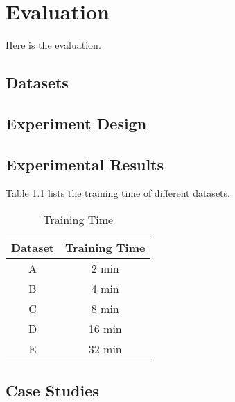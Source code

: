 \chapter{Evaluation} \label{chapter:evaluation}

Here is the evaluation.

\section{Datasets}

\section{Experiment Design}

\section{Experimental Results}

Table \ref{table:training_time} lists the training time of different datasets.

\begin{table}[h!]
\centering
\caption{Training Time}
\begin{tabular}{ |c|c| } 
\hline
\textbf{Dataset} & \textbf{Training Time} \\
\hline
\hline
A & 2 min \\
\hline
B & 4 min \\
\hline
C & 8 min \\
\hline
D & 16 min \\
\hline
E & 32 min \\
\hline
\end{tabular}
\label{table:training_time}
\end{table}

\section{Case Studies}
